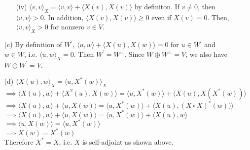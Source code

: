 \documentclass{article}
\begin{document}
\begin{itemize}
\begin{itemize}
\begin{itemize}
			            \item [(iv)] $\langle v,v\rangle_X=\langle v,v\rangle+\langle X(v),X(v)\rangle$ by definiton. If $v\neq 0$, then $\langle v,v\rangle>0$. In addition, $\langle X(v),X(v)\rangle\geq 0$ even if $X(v)=0$. Then, $\langle v,v\rangle_X>0$ for nonzero $v\in V$.
		            \end{itemize}
		      \item [(c)] By definition of $W^\prime$, $\langle u,w\rangle+\langle X(u),X(w)\rangle=0$ for $u\in W^\prime$ and $w\in W$, i.e. $\langle u,w\rangle_X=0$. Then $W^\prime=W^\perp$. Since $W\oplus W^\perp=V$, we also have $W\oplus W^\prime=V$.
		      \item [(d)] $\langle X(u),w\rangle_X=\langle u,X^*(w)\rangle_X$\\$\implies\langle X(u),w\rangle+\langle X^2(u),X(w)\rangle=\langle u,X^*(w)\rangle+\langle X(u),X(X^*(w))\rangle$\\$\implies\langle X(u),w\rangle+\langle u,X(w)\rangle=\langle u,X^*(w)\rangle+\langle X(u),(X\circ X)^*(w))\rangle$\\$\implies\langle X(u),w\rangle+\langle u,X(w)\rangle=\langle u,X^*(w)\rangle+\langle X(u),w\rangle$\\$\implies\langle u,X(w)\rangle=\langle u,X^*(w)\rangle$\\$\implies X(w)=X^*(w)$\\Therefore $X^*=X$, i.e. $X$ is self-adjoint as shown above.
	      \end{itemize}
\end{itemize}

\newpage
\end{document}
